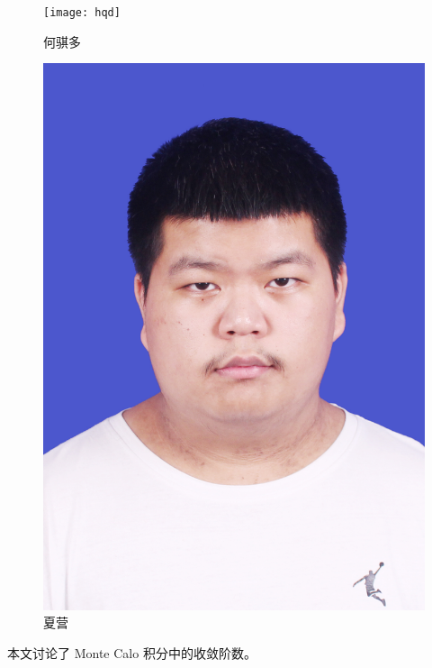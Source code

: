\documentclass[12pt,a4paper]{article}%
\begin{document}
\begin{figure}[h]
\begin{minipage}{0.305\textwidth}
            \centering
            \texttt{[image: hqd]}
            \caption{何骐多}
            \label{fig:img2}
        \end{minipage}\hfill
        \begin{minipage}{0.32\textwidth}
            \centering
            \includegraphics[width=\linewidth]{xy}
            \caption{夏营}
            \label{fig:img3}
        \end{minipage}
    \end{figure}
    本文讨论了 Monte Calo 积分中的收敛阶数。

    \begin{abstract}
        \fangsong

    \end{abstract}

    \begin{adjustwidth}{1.06cm}{1.06cm}
        \fontsize{10.5pt}{15.75pt}\\
    \end{adjustwidth}
\end{document}
